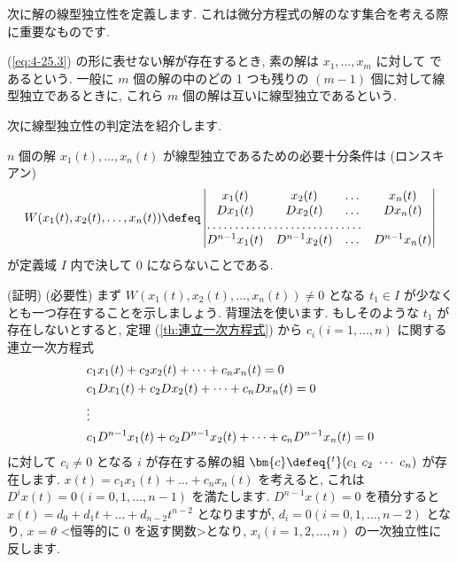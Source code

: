 \documentclass[openany, a4paper, oneside]{jsbook}
\begin{document}
次に解の線型独立性を定義します.
これは微分方程式の解のなす集合を考える際に重要なものです.
\begin{defn}
(\ref{eq:4-25.3}) の形に表せない解が存在するとき,
素の解は $x_1 , \dots , x_m$ に対して
であるという.
一般に $m$ 個の解の中のどの 1 つも残りの $(m-1)$ 個に対して線型独立であるときに,
これら $m$ 個の解は互いに線型独立であるという.
\end{defn}
次に線型独立性の判定法を紹介します.
\begin{thm}
$n$ 個の解 $x_1 (t) , \dots , x_n (t)$ が線型独立であるための必要十分条件は
(ロンスキアン)
\begin{gather}
W ( x_1 (t) , x_2 (t) , \dots , x_n (t) )
\defeq
\begin{vmatrix}
x_1 (t) & x_2 (t) & \dots & x_n (t) \\
D x_1 (t) & D x_2 (t) & \dots & D x_n (t) \\
\hdotsfor{3} \\
D^{n-1} x_1 (t) & D^{n-1} x_2 (t) & \dots & D^{n-1} x_n (t) \\
\end{vmatrix}
\end{gather}
が定義域 $I$ 内で決して $0$ にならないことである.
\end{thm}
(証明) (必要性)
まず $W ( x_1 (t) , x_2 (t) , \dots , x_n (t) ) \not = 0$ となる $t_1 \in I$ が少なくとも一つ存在することを示しましょう.
背理法を使います.
もしそのような $t_1$ が存在しないとすると, 定理 (\ref{th:連立一次方程式}) から $c_i (i=1,\dots,n)$ に関する連立一次方程式
\begin{align}
&c_1 x_1 (t) + c_2 x_2 (t) + \dots + c_n x_n (t) = 0 \\
&c_1 D x_1 (t) + c_2 D x_2 (t) + \dots + c_n D x_n (t) = 0 \\
&\vdots \notag \\
&c_1 D^{n-1} x_1 (t) + c_2 D^{n-1} x_2 (t) + \dots + c_n D^{n-1} x_n (t) = 0
\end{align}
に対して $c_i \not= 0$ となる $i$ が存在する解の組 $\bm{c} \defeq {^t} (c_1 \,\, c_2 \,\, \dotsb \,\, c_n)$ が存在します.
$x (t) = c_1 x_1 (t) + \dots + c_n x_n (t)$ を考えると, これは $D^i x (t) = 0 ( i = 0, 1, \dots , n-1)$ を満たします.
$D^{n-1} x (t) = 0$ を積分すると $x (t) = d_0 + d_1 t + \dots + d_{n-2} t^{n-2}$ となりますが,
$d_i = 0 ( i = 0 ,1 , \dots , n-2)$ となり,  $x = \theta$ <恒等的に 0 を返す関数>となり,
$x_i (i= 1, 2, \dots ,n)$ の一次独立性に反します.
\end{document}
